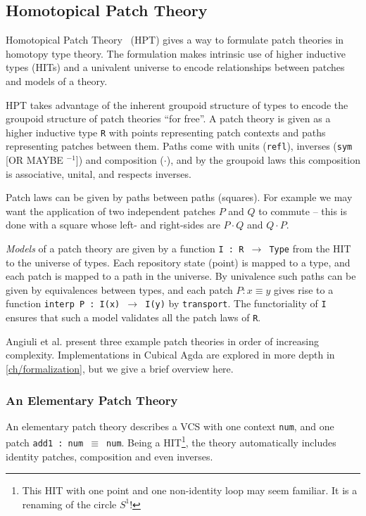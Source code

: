 \subsection{Homotopical Patch Theory}\label{subsec:hpt}

Homotopical Patch Theory~\cite{Angiuli2016} (HPT) gives a way to formulate patch
theories in homotopy type theory. The formulation makes intrinsic use of higher
inductive types (HITs) and a univalent universe to encode relationships between
patches and models of a theory.

HPT takes advantage of the inherent groupoid structure of types to encode the
groupoid structure of patch theories ``for free''. A patch theory is given as a
higher inductive type \texttt{R} with points representing patch contexts and
paths representing patches between them. Paths come with units (\texttt{refl}),
inverses (\texttt{sym} [OR MAYBE $^{-1}$]) and composition (\texttt{$\cdot$}),
and by the groupoid laws this composition is associative, unital, and respects
inverses.

Patch laws can be given by paths between paths (squares). For example we may
want the application of two independent patches $P$ and $Q$ to commute -- this is done with
a square whose left- and right-sides are $P \cdot Q$ and $Q \cdot P$.

\emph{Models} of a patch theory are given by a function \texttt{I : R
  $\rightarrow$ Type} from the HIT to the universe of types. Each repository
state (point) is mapped to a type, and each patch is mapped to a path in the
universe. By univalence such paths can be given by equivalences between types,
and each patch $P : x \equiv y$ gives rise to a function \texttt{interp P : I(x)
$\rightarrow$ I(y)} by \texttt{transport}. The functoriality of \texttt{I}
ensures that such a model validates all the patch laws of \texttt{R}.

Angiuli et al. present three example patch theories in order of increasing
complexity. Implementations in Cubical Agda are explored in more depth in
\autoref{ch/formalization}, but we give a brief overview here.

\subsubsection{An Elementary Patch Theory}

An elementary patch theory describes a VCS with one context \texttt{num}, and
one patch \texttt{add1 : num $\equiv$ num}. Being a HIT\footnote{This HIT with one point and
one non-identity loop may seem familiar. It is a renaming of the circle $S^1$!},
the theory automatically includes identity patches, composition and even inverses.

